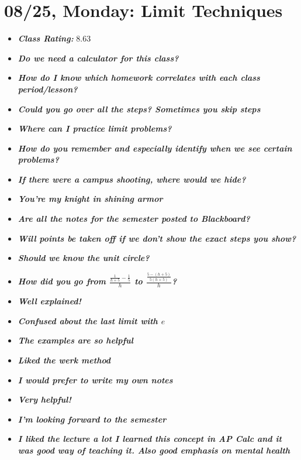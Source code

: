 \documentclass[11pt,letterpaper]{article}
\begin{document}
\newpage
\section*{08/25, Monday: Limit Techniques\label{08-25}}

\begin{itemize}
\item {\bfseries\itshape Class Rating:} 8.63
\item {\bfseries\itshape Do we need a calculator for this class?}
\item {\bfseries\itshape How do I know which homework correlates with each class period/lesson?} 
\item {\bfseries\itshape Could you go over all the steps? Sometimes you skip steps}
\item {\bfseries\itshape Where can I practice limit problems?}
\item {\bfseries\itshape How do you remember and especially identify when we see certain problems?}
\item {\bfseries\itshape If there were a campus shooting, where would we hide?}
\item {\bfseries\itshape You're my knight in shining armor} 
\item {\bfseries\itshape Are all the notes for the semester posted to Blackboard?}
\item {\bfseries\itshape Will points be taken off if we don't show the exact steps you show?}
\item {\bfseries\itshape Should we know the unit circle?}
\item {\bfseries\itshape How did you go from $\tfrac{\frac{1}{h + 5} - \frac{1}{5}}{h}$ to $\tfrac{\tfrac{5 - (h + 5)}{5(h + 5)}}{h}$?}
\item {\bfseries\itshape Well explained!}
\item {\bfseries\itshape Confused about the last limit with $e$} 
\item {\bfseries\itshape The examples are so helpful} 
\item {\bfseries\itshape Liked the werk method}
\item {\bfseries\itshape I would prefer to write my own notes}
\item {\bfseries\itshape Very helpful!}
\item {\bfseries\itshape I'm looking forward to the semester}
\item {\bfseries\itshape I liked the lecture a lot I learned this concept in AP Calc and it was good way of teaching it. Also good emphasis on mental health}

\end{itemize}
\end{document}
